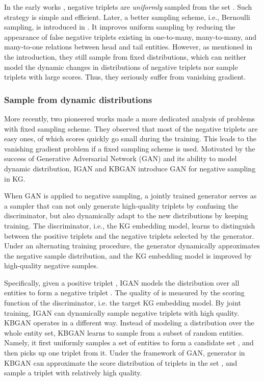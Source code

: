 \documentclass[conference]{IEEEtran}
\begin{document}
In the early works \cite{bordes2013translating}, 
negative triplets are \emph{uniformly} sampled from the set .
Such strategy is simple and efficient.
Later,
a better sampling scheme,
i.e.,
Bernoulli sampling, 
is introduced in \cite{wang2014knowledge}.
It improves uniform sampling
by reducing the appearance of false negative triplets
existing in one-to-many,
many-to-many,
and many-to-one relations between head and tail entities.
However,
as mentioned in the introduction,
they still sample from fixed distributions,
which can neither model the dynamic changes in distributions of negative triplets
nor sample triplets with large scores.
Thus,
they seriously suffer from vanishing gradient.









\subsubsection{Sample from dynamic distributions}



More recently, 
two pioneered works \cite{wang2018incorporating,cai2018kbgan}
made a more dedicated analysis of problems with fixed sampling scheme.
They observed that most of the negative triplets are easy ones,
of which scores quickly go small during the training.
This leads to the vanishing gradient problem
if a fixed sampling scheme is used.
Motivated by the success of Generative Adversarial Network (GAN) \cite{goodfellow2014generative} and its ability to model dynamic distribution,
IGAN and KBGAN introduce GAN for negative sampling in KG.


When GAN is applied to negative sampling, a jointly trained generator serves as a sampler 
that can not only generate high-quality triplets by confusing the discriminator, 
but also dynamically adapt to the new distributions by keeping training.
The discriminator, i.e., the KG embedding model,
learns to distinguish between the positive triplets and the negative triplets
selected by the generator.
Under an alternating training procedure,
the generator dynamically approximates the negative sample distribution,
and the KG embedding model is improved by high-quality negative samples.

Specifically,
given a positive triplet , 
IGAN models the distribution  over all entities 
to form a negative triplet .
The quality of  is measured by the scoring function of the discriminator,
i.e. the target KG embedding model.
By joint training, IGAN can dynamically sample negative triplets with high quality.
KBGAN operates in a different way.
Instead of modeling a distribution over the whole entity set,
KBGAN learns to sample from a subset of random entities.
Namely, it first uniformly samples a set of entities to form a candidate set ,
and then picks up one triplet from it.
Under the framework of GAN, 
generator in KBGAN can approximate the score distribution of triplets in the set ,
and sample a triplet with relatively high quality.
\end{document}
